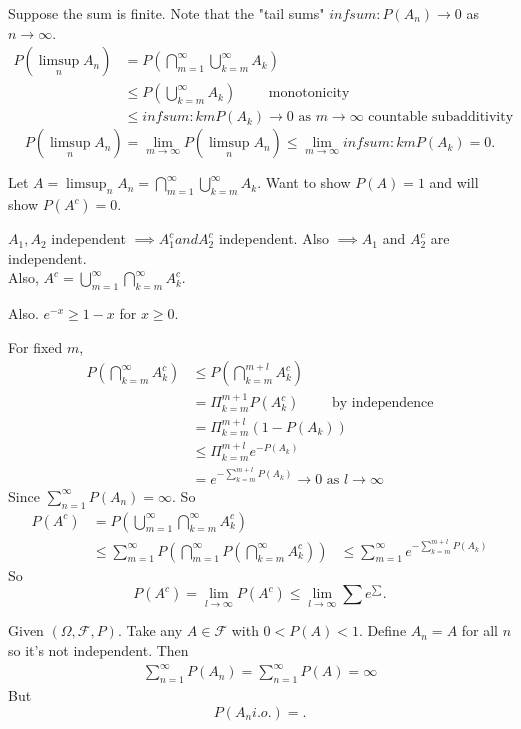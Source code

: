 \documentclass[class=article,crop=false]{standalone}
\begin{document}
\begin{prf}[1]
	Suppose the sum is finite. Note that the "tail sums" $ infsum:	P(A_n) \to 0 $ as $ n \to \infty$. 
	\begin{align*}
		P(\limsup_{  n} A_n) &= P\left( \bigcap_{ m= 1}^{\infty} \bigcup_{k= m}^{\infty} A_k \right)  \\
				     &\leq P\left( \bigcup_{ k=m}^{\infty} A_k \right) \qquad \text{ monotonicity} \\
				     &\leq infsum:km P(A_k) \to 0 \text{ as } m \to \infty \text{ countable subadditivity}
	\end{align*}
	\[
		P(\limsup_{  n} A_n) = \lim_{ m \to \infty} P(\limsup_{  n} A_n) \leq \lim_{ m \to \infty} infsum:km P(A_k) =0
	.\] 
\end{prf}
\begin{prf}[2]
	Let $ A = \limsup_{  n} A_n = \bigcap_{ m= 1}^{\infty} \bigcup_{k= m}^{\infty} A_k $. Want to show $ P(A)=1$ and will show  $ P(A^{c})=0$.\\
\begin{note}[]
$ A_1,A_2$ independent $ \implies A_1^{c} and A_2^{c}$  independent. Also $ \implies A_1$ and $ A_2^{c}$ are independent. \\

Also, $ A^{c} = \bigcup_{ m= 1}^{\infty} \bigcap_{k= m}^{\infty} A_k^{c} $.

Also. $ e^{-x} \geq 1-x$ for $ x\geq 0$.
\end{note}

For fixed $ m$, 
 \begin{align*}
	 P\left( \bigcap_{ k=m }^{\infty} A_k^{c} \right) &\leq P\left( \bigcap_{ k=m}^{m+l} A_k^{c} \right) \\
							  &= \Pi_{k=m}^{m+1} P(A_k^{c}) \qquad \text{ by independence} \\
							  &= \Pi_{k=m}^{m+l} (1- P(A_k)) \\
							  &\leq \Pi_{k=m}^{m+l} e^{-P(A_k)}\\
							  &= e^{- \sum_{ k= m}^{ m+l} P(A_k)} \to 0 \text{ as } l \to \infty 
\end{align*}
Since $ \sum_{ n= 1}^{\infty} P(A_n) = \infty$. So
\begin{align*}
	P(A^{c}) &= P(\bigcup_{ m=1}^{\infty} \bigcap_{k=m}^{\infty} A_k^{c})\\
		 &\leq \sum_{ m= 1}^{\infty} P(\bigcap_{ m =1}^{\infty} P\left( \bigcap_{ k =m}^{\infty} A_k^{c} \right) )
		 &\leq \sum_{ m= 1}^{\infty} e^{-\sum_{ k=m}^{ m+l} P(A_k)}
\end{align*}
So 
\[
	P(A^{c}) = \lim_{ l \to \infty} P(A^{c}) \leq \lim_{ l \to \infty} \sum e^{\sum}
.\] 

\end{prf}

\begin{eg}
	Given $ (\Omega, \mathcal{F},P)$. Take any $ A \in \mathcal{F}$ with $ 0<P(A)<1$. Define  $ A_n = A$ for all $ n$ so it's not independent. Then 
	 \begin{align*}
		 \sum_{ n= 1}^{\infty} P(A_n) = \sum_{ n= 1}^{\infty} P(A) = \infty
	\end{align*}
	But
	\[
		P(A_n i.o.) = 
	.\] 
\end{eg}
\end{document}
